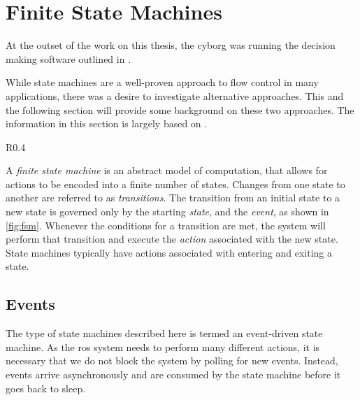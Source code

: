 \documentclass[\rootfolder/main.tex]{subfiles}
\begin{document}
\section{Finite State Machines}

At the outset of the work on this thesis, the cyborg was running the decision making software outlined in \cite{Andersen2017}.

While state machines are a well-proven approach to flow control in many applications, there was a desire to investigate alternative approaches.
This and the following section will provide some background on these two approaches.
The information in this section is largely based on \cite{Millington2009}.

\begin{wrapfigure}{R}{0.4\columnwidth}
    \caption{An example of a simple state machine.}
    \label{fig:fsm}
\end{wrapfigure}

A \emph{finite state machine} is an abstract model of computation, that allows for actions to be encoded into a finite number of states.
Changes from one state to another are referred to as \emph{transitions}.
The transition from an initial state to a new state is governed only by the starting \emph{state}, and the \emph{event}, as shown in \cref{fig:fsm}.
Whenever the conditions for a transition are met, the system will perform that transition and execute the \emph{action} associated with the new state.
State machines typically have actions associated with entering and exiting a state.


\subsection{Events}

The type of state machines described here is termed an event-driven state machine.
As the \acrshort{ros} system needs to perform many different actions, it is necessary that we do not block the system by polling for new events.
Instead, events arrive asynchronously and are consumed by the state machine before it goes back to sleep.

\end{document}
